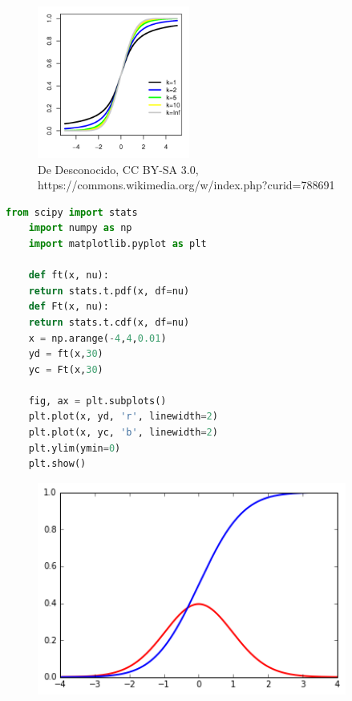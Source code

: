 \begin{figure}
	\centering
	\includegraphics[height=5cm,keepaspectratio=true]{./images/T_distributionCDF.png}
	\caption{De Desconocido, CC BY-SA 3.0, https://commons.wikimedia.org/w/index.php?curid=788691}
	\label{fig:tCDF}
\end{figure}

\begin{lstlisting}[language=Python, caption=Distribución $t$ en \texttt{Python}]
	from scipy import stats
	import numpy as np
	import matplotlib.pyplot as plt
	
	def ft(x, nu):
	return stats.t.pdf(x, df=nu)
	def Ft(x, nu):
	return stats.t.cdf(x, df=nu)
	x = np.arange(-4,4,0.01)
	yd = ft(x,30)
	yc = Ft(x,30)
	
	fig, ax = plt.subplots()
	plt.plot(x, yd, 'r', linewidth=2)
	plt.plot(x, yc, 'b', linewidth=2)
	plt.ylim(ymin=0)
	plt.show()
\end{lstlisting}



\begin{figure}
	\centering
	\includegraphics[height=7cm,keepaspectratio=true]{./images/tCDF.png}
\end{figure}



